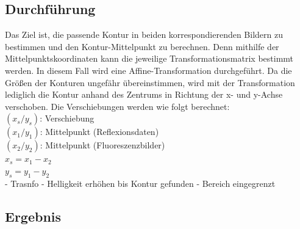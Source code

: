 \documentclass[conference]{IEEEtran}
\begin{document}
\subsection{Durchführung}

Das Ziel ist, die passende Kontur in beiden korrespondierenden Bildern zu bestimmen und den Kontur-Mittelpunkt zu berechnen. Denn mithilfe der Mittelpunktskoordinaten kann die jeweilige Transformationsmatrix bestimmt werden. In diesem Fall wird eine Affine-Transformation durchgeführt. Da die Größen der Konturen ungefähr übereinstimmen, wird mit der Transformation lediglich die Kontur anhand des Zentrums in Richtung der x- und y-Achse verschoben. Die Verschiebungen werden wie folgt berechnet: \\

$(x_s/y_s)$: Verschiebung \\
$(x_1/y_1)$: Mittelpunkt (Reflexionsdaten) \\
$(x_2/y_2)$: Mittelpunkt (Fluoreszenzbilder) \\
$x_s = x_1 - x_2$ \\
$y_s = y_1 - y_2$ \\

- Trasnfo
- Helligkeit erhöhen bis Kontur gefunden
- Bereich eingegrenzt

\subsection{Ergebnis}
\end{document}
